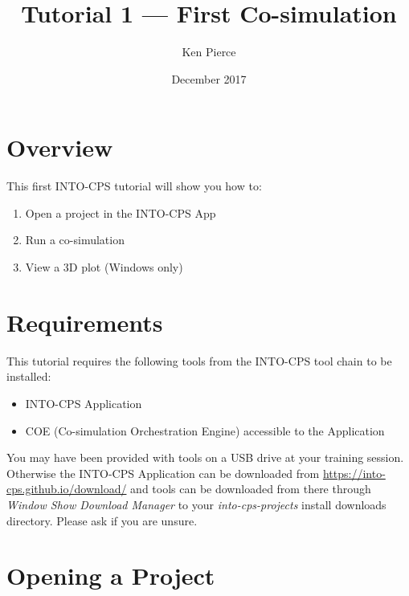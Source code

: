 \documentclass[11pt,a4paper]{../tutorial}
\title{Tutorial 1 --- First Co-simulation}
\date{December 2017}
\author{Ken Pierce}
\begin{document}
\section*{Overview}

This first INTO-CPS tutorial will show you how to:

\begin{enumerate}[noitemsep]
\item Open a project in the INTO-CPS App
\item Run a co-simulation
\item View a 3D plot (Windows only)
\end{enumerate}

\section*{Requirements}

This tutorial requires the following tools from the INTO-CPS tool chain to be installed:

\begin{itemize}[noitemsep]
\item INTO-CPS Application
\item COE (Co-simulation Orchestration Engine) accessible to the Application
\end{itemize}

You may have been provided with tools on a USB drive at your training session. Otherwise the INTO-CPS Application can be downloaded from \url{https://into-cps.github.io/download/} and tools can be downloaded from there through \emph{Window \menusep Show Download Manager} to your \emph{into-cps-projects} install downloads directory. Please ask if you are unsure.

\section{Opening a Project}
\end{document}
